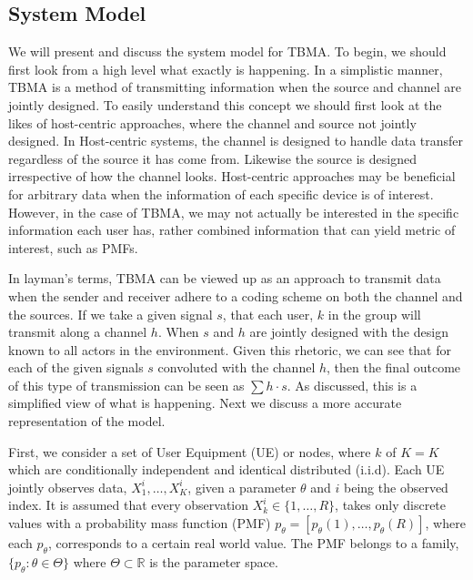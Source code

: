 \documentclass{article}
\begin{document}
\subsection{System Model}\label{sys_mod}
We will present and discuss the system model for TBMA. To begin, we should first look from a high level what exactly is happening. In a simplistic manner, TBMA is a method of transmitting information when the source and channel are jointly designed. To easily understand this concept we should first look at the likes of host-centric approaches, where the channel and source not jointly designed. In Host-centric systems, the channel is designed to handle data transfer regardless of the source it has come from. Likewise the source is designed irrespective of how the channel looks. Host-centric approaches may be beneficial for arbitrary data when the information of each specific device is of interest. However, in the case of TBMA, we may not actually be interested in the specific information each user has, rather combined information that can yield metric of interest, such as PMFs. 

In layman's terms, TBMA can be viewed up as an approach to transmit data when the sender and receiver adhere to a coding scheme on both the channel and the sources. If we take a given signal $s$, that each user, $k$ in the group will transmit along a channel $h$. When $s$ and $h$ are jointly designed with the design known to all actors in the environment. Given this rhetoric, we can see that for each of the given signals $s$ convoluted with the channel $h$, then the final outcome of this type of transmission can be seen as $\sum h \cdot s$. As discussed, this is a simplified view of what is happening. Next we discuss a more accurate representation of the model. 


First, we  consider a set of User Equipment (UE) or nodes, where ${k}$ of ${K} = K$ which are conditionally independent and identical distributed (i.i.d). Each UE jointly observes data, $X^i_1, \ldots, X^i_K$, given a parameter $\theta$ and $i$ being the observed index. It is assumed that every observation  ${X^i_k \in \{1, \ldots, R\}}$, takes only discrete values with a probability mass function (PMF) ${p_{\theta} = [p_{\theta}(1), \ldots, p_{\theta}(R)]}$, where each $p_{\theta}$, corresponds to a certain real world value. The PMF belongs to a family, $\{p_{\theta}: \theta \in \Theta\}$ where $\Theta \subset \mathbb{R}$ is the parameter space.
\end{document}
